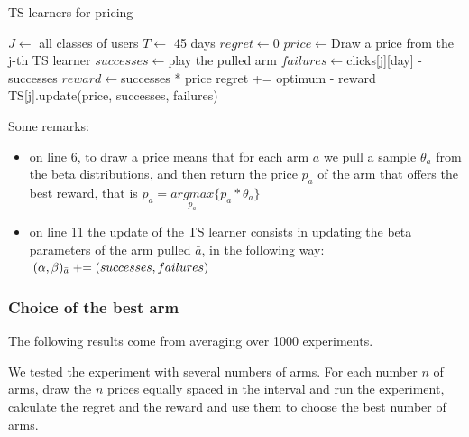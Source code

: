 \begin{algorithm}
    \caption{TS learners for pricing}
    \label{alg:ts_pricing}
	\begin{algorithmic}[1]
        \STATE $J\gets ${ all classes of users}
        \STATE $T\gets ${ 45 days }
        \STATE $regret\gets ${0}
		\STATE $price\gets ${Draw a price from the j-th TS learner}
        \STATE $successes\gets ${play the pulled arm}
        \STATE $failures\gets ${clicks[j][day] - successes}
        \STATE $reward\gets ${successes * price}
        \STATE regret += optimum - reward
        \STATE TS[j].update(price, successes, failures)
        \ENDFOR
        \ENDFOR
	\end{algorithmic}
\end{algorithm}

Some remarks:
\begin{itemize}
    \item on line 6, to draw a price means that for each arm $a$ we pull a sample $\theta_a$ from the beta distributions, and then return the price $p_a$ of the arm that offers the best reward, that is $p_a = \underset{p_a}{argmax} \{p_a * \theta_a\}$
    \item on line 11 the update of the TS learner consists in updating the beta parameters of the arm pulled $\bar{a}$, in the following way: $(\alpha, \beta)_{\bar{a}} \mathrel{+}= (successes, failures)$
\end{itemize}

\subsubsection{Choice of the best arm}\label{pricing_best_arm}
The following results come from averaging over 1000 experiments.

We tested the experiment with several numbers of arms. For each number $n$ of arms, draw the $n$ prices equally spaced in the interval and run the experiment, calculate the regret and the reward and use them to choose the best number of arms.



